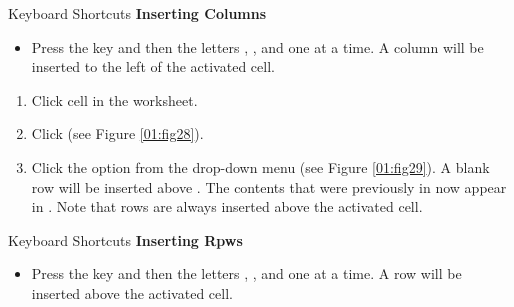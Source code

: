 \begin{center}
	\begin{shtcutbox}{Keyboard Shortcuts}
		\textbf{Inserting Columns}
		\\
		\begin{itemize}
			\setlength{\itemsep}{0pt}
			\setlength{\parskip}{0pt}
			\setlength{\parsep}{0pt}
			
			\item Press the  key and then the letters , , and  one at a time. A column will be inserted to the left of the activated cell.
			
		\end{itemize}
	\end{shtcutbox}
\end{center}

\begin{enumerate}[resume]
	\item Click cell  in the  worksheet.
	\item Click  (see Figure \ref{01:fig28}).
	\item Click the  option from the drop-down menu (see Figure \ref{01:fig29}). A blank row will be inserted above . The contents that were previously in  now appear in . Note that rows are always inserted above the activated cell.
\end{enumerate}

\begin{center}
	\begin{shtcutbox}{Keyboard Shortcuts}
		\textbf{Inserting Rpws}
		\\
		\begin{itemize}
			\setlength{\itemsep}{0pt}
			\setlength{\parskip}{0pt}
			\setlength{\parsep}{0pt}
			
			\item Press the  key and then the letters , , and  one at a time. A row will be inserted above the activated cell.
			
		\end{itemize}
	\end{shtcutbox}
\end{center}


